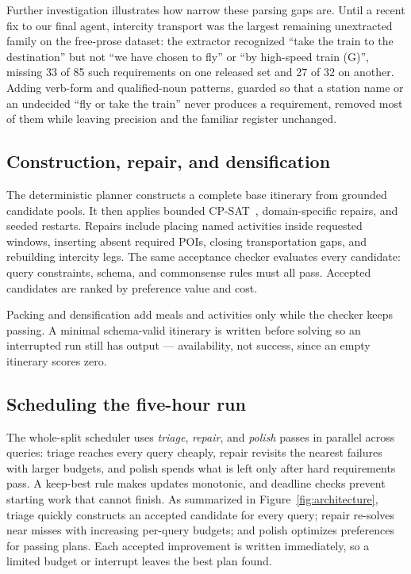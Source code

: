 \documentclass{article}
\begin{document}
Further investigation illustrates how narrow these parsing gaps are. Until a recent fix to our final agent, intercity
transport was the largest remaining unextracted family on the free-prose dataset: the
extractor recognized ``take the train to the destination'' but not ``we have
chosen to fly'' or ``by high-speed train (G)'', missing 33 of 85 such
requirements on one released set and 27 of 32 on another. Adding verb-form and
qualified-noun patterns, guarded so that a station name or an undecided
``fly or take the train'' never produces a requirement, removed most of them
while leaving precision and the familiar register unchanged.

\subsection{Construction, repair, and densification}

The deterministic planner constructs a complete base itinerary from grounded
candidate pools. It then applies bounded CP-SAT~\cite{ortools},
domain-specific repairs, and seeded restarts. Repairs include placing named
activities inside requested windows, inserting absent required POIs, closing
transportation gaps, and rebuilding intercity legs. The same acceptance checker
evaluates every candidate: query constraints, schema, and commonsense rules must
all pass. Accepted candidates are ranked by preference value and cost.

Packing and densification add meals and activities only while the checker keeps
passing. A minimal schema-valid itinerary is written before solving so an
interrupted run still has output --- availability, not success, since an empty
itinerary scores zero.

\subsection{Scheduling the five-hour run}

The whole-split scheduler uses \emph{triage}, \emph{repair}, and \emph{polish}
passes in parallel across queries: triage reaches every query cheaply, repair
revisits the nearest failures with larger budgets, and polish spends what is left
only after hard requirements pass. A keep-best rule makes updates monotonic, and
deadline checks prevent starting work that cannot finish. As summarized in
Figure~\ref{fig:architecture}, triage quickly constructs an accepted candidate
for every query; repair re-solves near misses with increasing per-query budgets;
and polish optimizes preferences for passing plans. Each accepted improvement is
written immediately, so a limited budget or interrupt leaves the best plan found.
\end{document}
